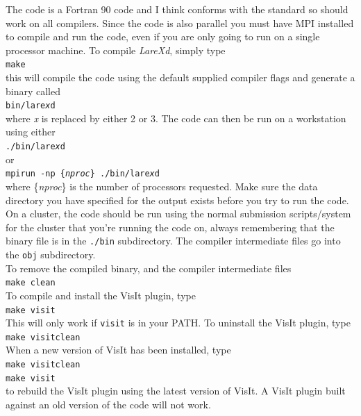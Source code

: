 \documentclass[11pt]{article}
\begin{document}
The code is a Fortran 90 code and I think conforms with the standard so should work on all compilers. Since the code is also parallel you must have MPI installed to compile and run the code, even if you are only going to run on a single processor machine.
To compile {\it LareXd}, simply type\\
\texttt{make}\\
this will compile the code using the default supplied compiler flags and generate a binary called\\
\texttt{bin/lare{\it x}d}\\
where {\it x} is replaced by either 2 or 3. The code can then be run on a workstation using either\\
\texttt{./bin/lare{\it x}d}\\
or\\
\texttt{mpirun -np \{{\it nproc}\} ./bin/lare{\it x}d}\\
where \{{\it nproc}\} is the number of processors requested. Make sure the data directory you have specified for the output exists
before you try to run the code. On a cluster, the
code should be run using the normal submission scripts/system for the cluster
that you're running the code on, always remembering that the binary file is in
the \texttt{./bin} subdirectory. The compiler intermediate files go into the
\texttt{obj} subdirectory. \\

To remove the compiled binary, and the compiler intermediate files\\
\texttt{make clean}\\
To compile and install the VisIt plugin, type\\
\texttt{make visit}\\
This will only work if \texttt{visit} is in your PATH. To uninstall the VisIt plugin, type\\
\texttt{make visitclean}\\
When a new version of VisIt has been installed, type\\
\texttt{make visitclean}\\
\texttt{make visit}\\
to rebuild the VisIt plugin using the latest version of VisIt. A VisIt plugin built against an old version of the code will not work.
\end{document}
